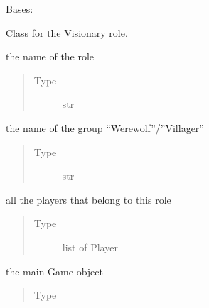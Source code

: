 \documentclass[letterpaper,10pt,english]{sphinxmanual}
\begin{document}
\begin{fulllineitems}
Bases: 

Class for the Visionary role.


\begin{fulllineitems}
the name of the role
\begin{quote}\begin{description}
\item[{Type}] \leavevmode
str

\end{description}\end{quote}

\end{fulllineitems}



\begin{fulllineitems}
the name of the group “Werewolf”/”Villager”
\begin{quote}\begin{description}
\item[{Type}] \leavevmode
str

\end{description}\end{quote}

\end{fulllineitems}



\begin{fulllineitems}
all the players that belong to this role
\begin{quote}\begin{description}
\item[{Type}] \leavevmode
list of Player

\end{description}\end{quote}

\end{fulllineitems}



\begin{fulllineitems}
the main Game object
\begin{quote}\begin{description}
\item[{Type}] \leavevmode
{\hyperref[\detokenize{chatwolf:chatwolf.game.Game}]{}}


\end{description}
\end{quote}
\end{fulllineitems}
\end{fulllineitems}
\end{document}
